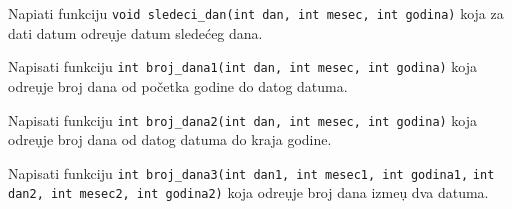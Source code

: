 \begin{Exercise}[label=p1.4_] 
Napiati funkciju
\verb|void sledeci_dan(int dan, int mesec, int godina)| koja za dati
datum odre\d uje datum slede\'ceg dana. \\ 
\end{Exercise}
\begin{Answer}[ref=p1.4_]
\end{Answer}

\begin{Exercise}[label=p1.4_] 
Napisati funkciju
\verb|int broj_dana1(int dan, int mesec, int godina)| koja odre\d uje
broj dana od po\v cetka godine do datog datuma.\\ 
\end{Exercise}
\begin{Answer}[ref=p1.4_]
\end{Answer}

\begin{Exercise}[label=p1.4_] 
Napisati funkciju
\verb|int broj_dana2(int dan, int mesec, int godina)| koja odre\d uje
broj dana od datog datuma do kraja godine.\\ 
\end{Exercise}
\begin{Answer}[ref=p1.4_]
\end{Answer}

\begin{Exercise}[label=p1.4_] 
Napisati funkciju
\verb|int broj_dana3(int dan1, int mesec1, int godina1,|
\verb|int dan2, int mesec2, int godina2)| koja odre\d uje broj dana
izme\d u dva datuma.\\ 
\end{Exercise}
\begin{Answer}[ref=p1.4_]
\end{Answer}


